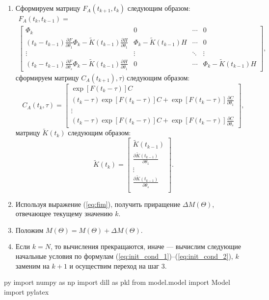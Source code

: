 \documentclass[a4paper,14pt]{extarticle}
\newcommand{\pd}[2]{\frac{\partial #1}{\partial #2}}
\begin{document}
\begin{enumerate}
\item Сформируем матрицу $F_A(t_{k+1}, t_k)$ следующим образом:
\begin{gather*}
	F_A(t_k, t_{k-1}) = \\
	\begin{bmatrix}
		\Phi_k & 0 & \cdots & 0 \\
		(t_k - t_{k-1}) \pd{F}{\theta_1} \Phi_k - \tilde{K}(t_{k-1})
			\pd{H}{\theta_1} & \Phi_k - \tilde{K}(t_{k-1}) H & \cdots & 0 \\
		\vdots & \vdots & \ddots & \vdots \\
		(t_k - t_{k-1}) \pd{F}{\theta_s} \Phi_k - \tilde{K}(t_{k-1})
			\pd{H}{\theta_1} & 0 & \cdots & \Phi_k - \tilde{K}(t_{k-1}) H
	\end{bmatrix},
\end{gather*}
сформируем матрицу $C_A(t_{k+1}), \tau)$ следующим образом:
	\[
		C_A(t_k, \tau) =
		\begin{bmatrix}
			\exp[ F(t_k - \tau) ] C \\
			(t_k - \tau) \exp[F(t_k - \tau)] C + \exp[ F(t_k - \tau) ]
				\pd{C}{\theta_1} \\
			\vdots \\
			(t_k - \tau) \exp[F(t_k - \tau)] C + \exp[ F(t_k - \tau) ]
				\pd{C}{\theta_s} 
		\end{bmatrix},
	\]
матрицу $\tilde{K}(t_k)$ следующим образом:
\[
	\tilde{K}(t_k) =
	\begin{bmatrix}
		\tilde{K}(t_{k-1}) \\
		\pd{\tilde{K}(t_{k-1})}{\theta_1} \\
		\vdots \\
		\pd{\tilde{K}(t_{k-1})}{\theta_s} \\
	\end{bmatrix}.
\]

\item Используя выражение (\ref{eq:fim}), получить приращение 
	$\Delta M(\Theta)$, отвечающее текущему значению $k$.

\item Положим $M(\Theta) = M(\Theta) + \Delta M(\Theta)$.

\item Если $k = N$, то вычисления прекращаются, иначе --- вычислим следующие
	начальные условия по формулам (\ref{eq:init_cond_1})--(\ref{eq:init_cond_2}),
	$k$ заменим на $k + 1$ и осуществим переход на шаг 3.

\end{enumerate}

\begin{pythontexcustomcode}{py}
import numpy as np
import dill as pkl
from model.model import Model
import pylatex
\end{pythontexcustomcode}
\end{document}

